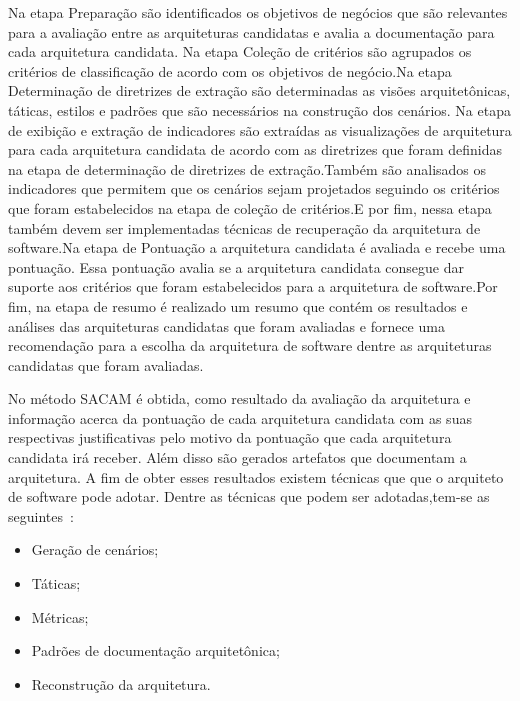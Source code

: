 Na etapa Preparação são identificados os objetivos de negócios que são relevantes para a avaliação entre as arquiteturas candidatas e avalia a documentação para cada arquitetura candidata. Na etapa Coleção de critérios são agrupados os critérios de classificação de acordo com os objetivos de negócio.Na etapa Determinação de diretrizes de extração são determinadas as visões arquitetônicas, táticas, estilos e padrões que são necessários na construção dos cenários. Na etapa de exibição e extração de indicadores são extraídas as visualizações de arquitetura para cada arquitetura candidata de acordo com as diretrizes que foram definidas na etapa de determinação de diretrizes de extração.Também são analisados os indicadores que permitem que os cenários sejam projetados seguindo os critérios que foram estabelecidos na etapa de coleção de critérios.E por fim, nessa etapa também devem ser implementadas técnicas de recuperação da arquitetura de software.Na etapa de Pontuação a arquitetura candidata é avaliada e recebe uma pontuação. Essa pontuação avalia se a arquitetura candidata consegue dar suporte aos critérios que foram estabelecidos para a arquitetura de software.Por fim, na etapa de resumo é realizado um resumo que contém os resultados e análises das arquiteturas candidatas que foram avaliadas e fornece uma recomendação para a escolha da arquitetura de software dentre as arquiteturas candidatas que foram avaliadas.

No método SACAM é obtida, como resultado da avaliação da arquitetura e informação acerca da pontuação de cada arquitetura candidata com as suas respectivas justificativas pelo motivo da pontuação que cada arquitetura candidata irá receber. Além disso são gerados artefatos que documentam a arquitetura. A fim de obter esses resultados existem técnicas que que o arquiteto de software pode adotar. Dentre as técnicas que podem ser adotadas,tem-se as seguintes~\cite{SACAM}:

\begin{itemize}
    \item Geração de cenários;
    \item Táticas;
    \item Métricas;
    \item Padrões de documentação arquitetônica;
    \item Reconstrução da arquitetura.
\end{itemize}

